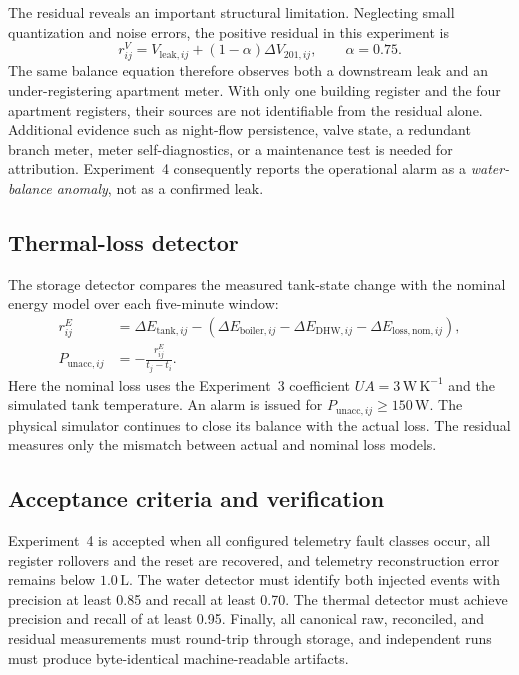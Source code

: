 \documentclass[11pt,a4paper]{article}
\begin{document}
The residual reveals an important structural limitation. Neglecting small
quantization and noise errors, the positive residual in this experiment is
\begin{equation}
  r^V_{ij}
  = V_{\mathrm{leak},ij}
    + (1-\alpha)\Delta V_{201,ij},
  \qquad \alpha=0.75.
\end{equation}
The same balance equation therefore observes both a downstream leak and an
under-registering apartment meter. With only one building register and the four
apartment registers, their sources are not identifiable from the residual
alone. Additional evidence such as night-flow persistence, valve state, a
redundant branch meter, meter self-diagnostics, or a maintenance test is needed
for attribution. Experiment~4 consequently reports the operational alarm as a
\emph{water-balance anomaly}, not as a confirmed leak.

\subsection{Thermal-loss detector}
The storage detector compares the measured tank-state change with the nominal
energy model over each five-minute window:
\begin{align}
  r^E_{ij}
    &= \Delta E_{\mathrm{tank},ij}
       - \left(\Delta E_{\mathrm{boiler},ij}
       - \Delta E_{\mathrm{DHW},ij}
       - \Delta E_{\mathrm{loss,nom},ij}\right),\\
  P_{\mathrm{unacc},ij} &= -\frac{r^E_{ij}}{t_j-t_i}.
\end{align}
Here the nominal loss uses the Experiment~3 coefficient
$UA=3\,\mathrm{W\,K^{-1}}$ and the simulated tank temperature. An alarm is
issued for $P_{\mathrm{unacc},ij}\geq150\,\mathrm{W}$. The physical simulator
continues to close its balance with the actual loss. The residual measures only
the mismatch between actual and nominal loss models.

\subsection{Acceptance criteria and verification}
Experiment~4 is accepted when all configured telemetry fault classes occur,
all register rollovers and the reset are recovered, and telemetry reconstruction
error remains below $1.0\,\mathrm{L}$. The water detector must identify both
injected events with precision at least 0.85 and recall at least 0.70. The
thermal detector must achieve precision and recall of at least 0.95. Finally,
all canonical raw, reconciled, and residual measurements must round-trip through
storage, and independent runs must produce byte-identical machine-readable
artifacts.
\end{document}
